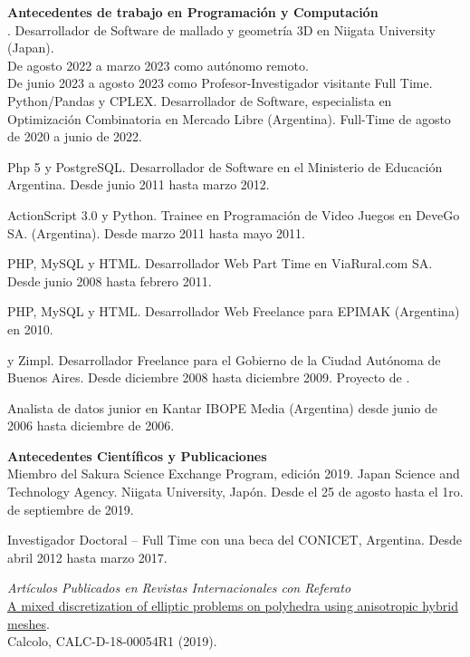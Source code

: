 \textbf{Antecedentes de trabajo en Programaci\'on y Computaci\'on}\\[6pt]
\Cpp. Desarrollador de Software de mallado y geometr\'ia 3D en Niigata University (Japan).\\
De agosto 2022 a marzo 2023 como aut\'onomo remoto.\\
De junio 2023 a agosto 2023 como Profesor-Investigador visitante Full Time.\\

Python/Pandas y CPLEX. Desarrollador de Software, especialista en
Optimizaci\'on Combinatoria en Mercado Libre (Argentina). 
Full-Time de agosto de 2020 a junio de 2022.

Php 5 y PostgreSQL.  Desarrollador de Software en el
Ministerio de Educaci\'on Argentina. Desde junio 2011 hasta
marzo 2012. 

ActionScript 3.0 y Python. Trainee en Programaci\'on de Video Juegos en
DeveGo SA. (Argentina). Desde marzo 2011 hasta mayo 2011.

PHP, MySQL y HTML. Desarrollador Web Part Time en ViaRural.com SA. Desde junio 2008
hasta febrero 2011.

PHP, MySQL y HTML. Desarrollador Web Freelance para EPIMAK (Argentina)
en 2010. 

\Cpp y Zimpl. Desarrollador Freelance para el Gobierno de la 
Ciudad Aut\'onoma de Buenos Aires. Desde diciembre 2008 hasta diciembre 2009. 
Proyecto de \href{https://github.com/alexisjawtu/ilp_auction}
{\color{blue}{un software de optimizaci\'on}}. 

Analista de datos junior  en Kantar IBOPE
Media (Argentina) desde junio de 2006 hasta diciembre de 2006.

\textbf{Antecedentes Cient\'ificos y Publicaciones}\\[6pt]
Miembro del Sakura Science Exchange Program, edici\'on 2019. Japan Science and
Technology Agency. Niigata University, Jap\'on. Desde el 25 de agosto hasta el 1ro.
de septiembre de 2019.

Investigador Doctoral  -- Full Time con una beca del CONICET,
Argentina. Desde abril 2012 hasta marzo 2017.

\emph{Art\'iculos Publicados en Revistas Internacionales con Referato}\\
\href{http://em.rdcu.be/wf/click?upn=lMZy1lernSJ7apc5DgYM8RtiRnX98cgbvE81KQGn5tE-3D_-2Fq09Vpjrycd-2BAOhvYDidHaHWLaG8WMoWs1lRs2mKTzqCwYNFhlGtplH8kb8yUCOrEFESCWAEP1qrD-2BJgg09nu-2Fz61XDXWYdppeXx4JzFRLvI-2FYyjZMrov-2FaxFxLv9MaqfC-2BjYanB-2FkLIArphbTB7hvuq-2BJ-2BP0dpoVrgh2NJYizQcMbyo6AA8jcx6RYsWvb3RMk9c7QXTqmoLaHKr8Xg6yK2lC1IxrYwuPPxXUxfxXQc0WAqTO-2Bg-2F9P-2BWkhJXyogoqkg5GNjl1KqQhJV5xi014g-3D-3D}
{\color{blue}A mixed discretization of elliptic problems on polyhedra using anisotropic hybrid meshes}.\\
Calcolo, CALC-D-18-00054R1 (2019).

